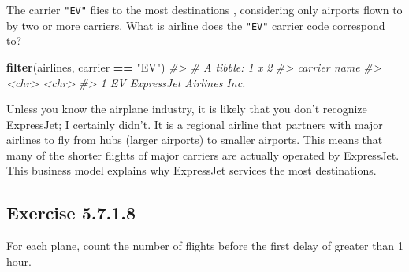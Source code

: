 \documentclass[]{book}
\newenvironment{Shaded}{\begin{snugshade}}{\end{snugshade}}
\newcommand{\CommentTok}[1]{\textcolor[rgb]{0.56,0.35,0.01}{\textit{#1}}}
\newcommand{\DataTypeTok}[1]{\textcolor[rgb]{0.13,0.29,0.53}{#1}}
\newcommand{\DecValTok}[1]{\textcolor[rgb]{0.00,0.00,0.81}{#1}}
\newcommand{\KeywordTok}[1]{\textcolor[rgb]{0.13,0.29,0.53}{\textbf{#1}}}
\newcommand{\NormalTok}[1]{#1}
\newcommand{\OperatorTok}[1]{\textcolor[rgb]{0.81,0.36,0.00}{\textbf{#1}}}
\newcommand{\OtherTok}[1]{\textcolor[rgb]{0.56,0.35,0.01}{#1}}
\newcommand{\StringTok}[1]{\textcolor[rgb]{0.31,0.60,0.02}{#1}}
\theoremstyle{plain}
\theoremstyle{remark}
\begin{document}
The carrier \texttt{"EV"} flies to the most destinations , considering
only airports flown to by two or more carriers. What is airline does the
\texttt{"EV"} carrier code correspond to?

\begin{Shaded}
\begin{Highlighting}[]
\KeywordTok{filter}\NormalTok{(airlines, carrier }\OperatorTok{==}\StringTok{ "EV"}\NormalTok{)}
\CommentTok{#> # A tibble: 1 x 2}
\CommentTok{#>   carrier name                    }
\CommentTok{#>   <chr>   <chr>                   }
\CommentTok{#> 1 EV      ExpressJet Airlines Inc.}
\end{Highlighting}
\end{Shaded}

Unless you know the airplane industry, it is likely that you don't
recognize \href{https://en.wikipedia.org/wiki/ExpressJet}{ExpressJet}; I
certainly didn't. It is a regional airline that partners with major
airlines to fly from hubs (larger airports) to smaller airports. This
means that many of the shorter flights of major carriers are actually
operated by ExpressJet. This business model explains why ExpressJet
services the most destinations.

\hypertarget{exercise-5.7.1.8}{%
\subsection*{\texorpdfstring{Exercise
{5.7.1.8}}{Exercise 5.7.1.8}}\label{exercise-5.7.1.8}}

For each plane, count the number of flights before the first delay of
greater than 1 hour.

\begin{Shaded}
\end{Shaded}
\end{document}
